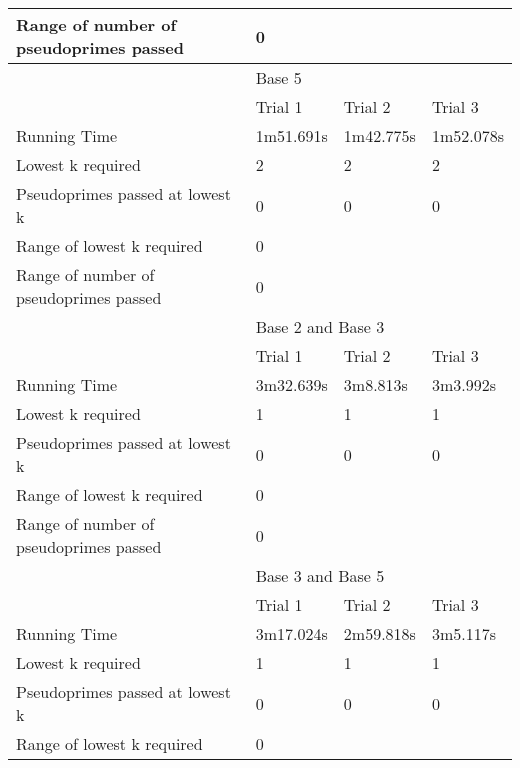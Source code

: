 \documentclass{article}
\begin{document}
\begin{table}[h]
\begin{tabular}{@{}llll@{}}
Range of number of pseudoprimes passed & \multicolumn{3}{l}{0}                 \\\midrule
                                       & \multicolumn{3}{l}{Base 5}            \\\midrule
                                       & Trial 1     & Trial 2    & Trial 3    \\
Running Time                           & 1m51.691s   & 1m42.775s  & 1m52.078s  \\
Lowest k required                      & 2           & 2          & 2          \\
Pseudoprimes passed at lowest k        & 0           & 0          & 0          \\
Range of lowest k required             & \multicolumn{3}{l}{0}                 \\
Range of number of pseudoprimes passed & \multicolumn{3}{l}{0}                 \\\midrule
                                       & \multicolumn{3}{l}{Base 2 and Base 3} \\\midrule
                                       & Trial 1     & Trial 2    & Trial 3    \\
Running Time                           & 3m32.639s   & 3m8.813s   & 3m3.992s   \\
Lowest k required                      & 1           & 1          & 1          \\
Pseudoprimes passed at lowest k        & 0           & 0          & 0          \\
Range of lowest k required             & \multicolumn{3}{l}{0}                 \\
Range of number of pseudoprimes passed & \multicolumn{3}{l}{0}                 \\
                                       & \multicolumn{3}{l}{Base 3 and Base 5} \\\midrule
                                       & Trial 1     & Trial 2    & Trial 3    \\
Running Time                           & 3m17.024s   & 2m59.818s  & 3m5.117s   \\
Lowest k required                      & 1           & 1          & 1          \\
Pseudoprimes passed at lowest k        & 0           & 0          & 0          \\
Range of lowest k required             & \multicolumn{3}{l}{0}                 \\

\end{tabular}
\end{table}
\end{document}
